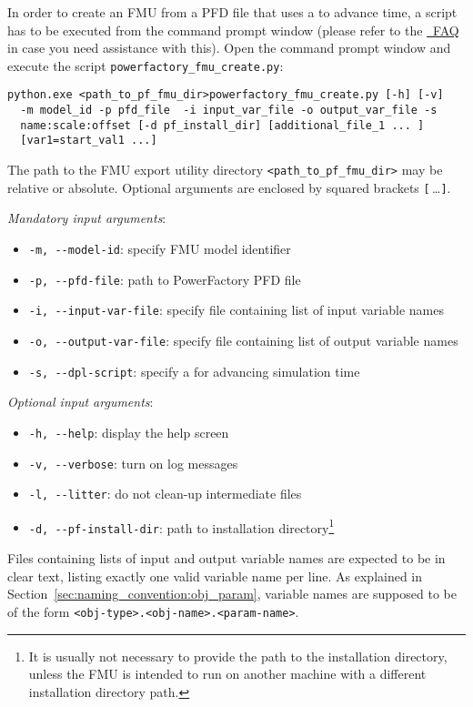 In order to create an FMU from a PFD file that uses a \dplscript to advance time, a \python script has to be executed from the command prompt window (please refer to the \href{https://docs.python.org/2/faq/windows.html}{\python~FAQ} in case you need assistance with this).
Open the command prompt window and execute the script \texttt{powerfactory\_fmu\_create.py}:

\begin{verbatim}
python.exe <path_to_pf_fmu_dir>powerfactory_fmu_create.py [-h] [-v] 
  -m model_id -p pfd_file  -i input_var_file -o output_var_file -s
  name:scale:offset [-d pf_install_dir] [additional_file_1 ... ]
  [var1=start_val1 ...]
\end{verbatim}

The path to the \fmipp \pf FMU export utility directory \verb!<path_to_pf_fmu_dir>! may be relative or absolute.
Optional arguments are enclosed by squared brackets \verb![!$\,$\ldots\verb!]!.
  
\textit{Mandatory input arguments}:
\begin{itemize}
  \item \verb!-m, --model-id!: specify FMU model identifier
  \item \verb!-p, --pfd-file!: path to PowerFactory PFD file
  \item \verb!-i, --input-var-file!: specify file containing list of input variable names
  \item \verb!-o, --output-var-file!: specify file containing list of output variable names
  \item \verb!-s, --dpl-script!: specify a \dplscript for advancing simulation time
\end{itemize}
\textit{Optional input arguments}:
\begin{itemize}
  \item \verb!-h, --help!: display the help screen
  \item \verb!-v, --verbose!: turn on log messages
  \item \verb!-l, --litter!: do not clean-up intermediate files
  \item \verb!-d, --pf-install-dir!: path to \pf installation directory\footnote{It is usually not necessary to provide the path to the \pf installation directory, unless the FMU is intended to run on another machine with a different installation directory path.}
\end{itemize}
Files containing lists of input and output variable names are expected to be in clear text, listing exactly one valid variable name per line.
As explained in Section~\ref{sec:naming_convention:obj_param}, variable names are supposed to be of the form \texttt{<obj-type>.<obj-name>.<param-name>}.

